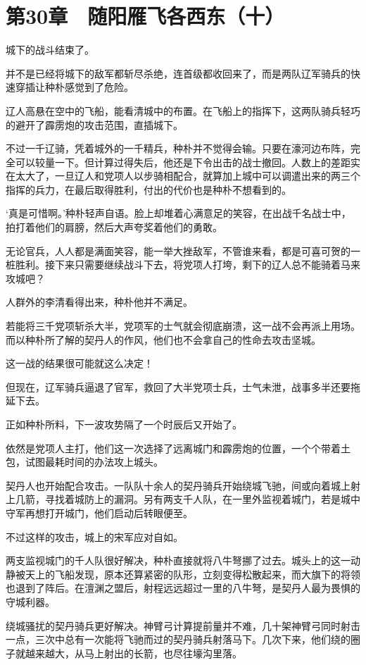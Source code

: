 \section{第30章　随阳雁飞各西东（十）}

城下的战斗结束了。 

并不是已经将城下的敌军都斩尽杀绝，连首级都收回来了，而是两队辽军骑兵的快速穿插让种朴感觉到了危险。 

辽人高悬在空中的飞船，能看清城中的布置。在飞船上的指挥下，这两队骑兵轻巧的避开了霹雳炮的攻击范围，直插城下。 

不过一千辽骑，凭着城外的一千精兵，种朴并不觉得会输。只要在濠河边布阵，完全可以较量一下。但计算过得失后，他还是下令出击的战士撤回。人数上的差距实在太大了，一旦辽人和党项人以步骑相配合，就算加上城中可以调遣出来的两三个指挥的兵力，在最后取得胜利，付出的代价也是种朴不想看到的。 

‘真是可惜啊。’种朴轻声自语。脸上却堆着心满意足的笑容，在出战千名战士中，拍打着他们的肩膀，然后大声夸奖着他们的勇敢。 

无论官兵，人人都是满面笑容，能一举大挫敌军，不管谁来看，都是可喜可贺的一桩胜利。接下来只需要继续战斗下去，将党项人打垮，剩下的辽人总不能骑着马来攻城吧？ 

人群外的李清看得出来，种朴他并不满足。 

若能将三千党项斩杀大半，党项军的士气就会彻底崩溃，这一战不会再派上用场。而以种朴所了解的契丹人的作风，他们也不会拿自己的性命去攻击坚城。 

这一战的结果很可能就这么决定！ 

但现在，辽军骑兵逼退了官军，救回了大半党项士兵，士气未泄，战事多半还要拖延下去。

正如种朴所料，下一波攻势隔了一个时辰后又开始了。 

依然是党项人主打，他们这一次选择了远离城门和霹雳炮的位置，一个个带着土包，试图最耗时间的办法攻上城头。 

契丹人也开始配合攻击。一队队十余人的契丹骑兵开始绕城飞驰，间或向着城上射上几箭，寻找着城防上的漏洞。另有两支千人队，在一里外监视着城门，若是城中守军再想打开城门，他们启动后转眼便至。 

不过这样的攻击，城上的宋军应对自如。 

两支监视城门的千人队很好解决，种朴直接就将八牛弩挪了过去。城头上的这一动静被天上的飞船发现，原本还算紧密的队形，立刻变得松散起来，而大旗下的将领也退到了阵后。在澶渊之盟后，射程远远超过一里的八牛弩，是契丹人最为畏惧的守城利器。 

绕城骚扰的契丹骑兵更好解决。神臂弓计算提前量并不难，几十架神臂弓同时射击一点，三次中总有一次能将飞驰而过的契丹骑兵射落马下。几次下来，他们绕的圈子就越来越大，从马上射出的长箭，也尽往壕沟里落。 

